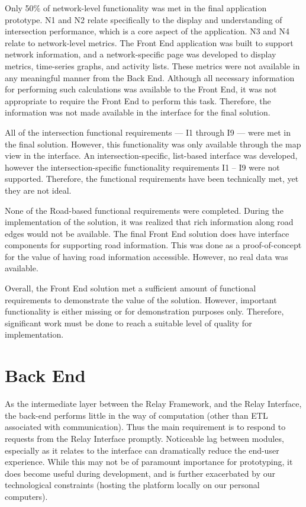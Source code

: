 \documentclass{report}
\begin{document}
Only 50\% of network-level functionality was met in the final application prototype. N1 and N2 relate specifically to the display and understanding of intersection performance, which is a core aspect of the application. N3 and N4 relate to network-level metrics. The Front End application was built to support network information, and a network-specific page was developed to display metrics, time-series graphs, and activity lists. These metrics were not available in any meaningful manner from the Back End. Although all necessary information for performing such calculations was available to the Front End, it was not appropriate to require the Front End to perform this task. Therefore, the information was not made available in the interface for the final solution.

All of the intersection functional requirements --- I1 through I9 --- were met in the final solution. However, this functionality was only available through the map view in the interface. An intersection-specific, list-based interface was developed, however the intersection-specific functionality requirements I1 -- I9 were not supported. Therefore, the functional requirements have been technically met, yet they are not ideal.

None of the Road-based functional requirements were completed. During the implementation of the solution, it was realized that rich information along road edges would not be available. The final Front End solution does have interface components for supporting road information. This was done as a proof-of-concept for the value of having road information accessible. However, no real data was available.

Overall, the Front End solution met a sufficient amount of functional requirements to demonstrate the value of the solution. However, important functionality is either missing or for demonstration purposes only. Therefore, significant work must be done to reach a suitable level of quality for implementation.

\section{Back End}

As the intermediate layer between the Relay Framework, and the Relay Interface, the back-end performs little in the way of computation (other than ETL associated with communication).
Thus the main requirement is to respond to requests from the Relay Interface promptly.
Noticeable lag between modules, especially as it relates to the interface can dramatically reduce the end-user experience.
While this may not be of paramount importance for prototyping, it does become useful during development, and is further exacerbated by our technological constraints (hosting the platform locally on our personal computers).
\end{document}
